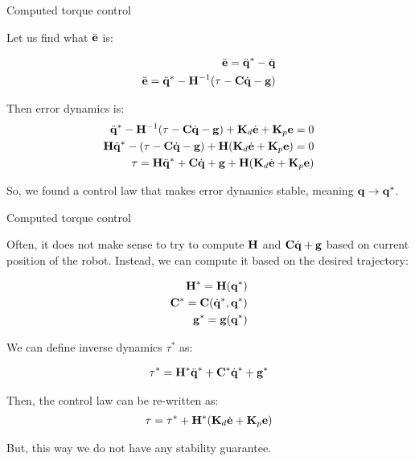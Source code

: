 \documentclass{beamer}
\begin{document}
\begin{frame}{Computed torque control}
	\begin{flushleft}
		
		Let us find what  $\ddot{\mathbf{e}}$ is:
		
		\begin{align}
			\ddot{\mathbf{e}} = \ddot{\mathbf{q}}^* - \ddot{\mathbf{q}} 
			\\
			\ddot{\mathbf{e}} = \ddot{\mathbf{q}}^* -  \mathbf{H}^{-1}(\tau - \mathbf{C} \dot{\mathbf{q}} - \mathbf{g})
		\end{align}
	
		Then error dynamics is:
		\begin{align}
\ddot{\mathbf{q}}^* -  \mathbf{H}^{-1}(\tau - \mathbf{C} \dot{\mathbf{q}} - \mathbf{g})
 + \mathbf{K}_d \dot{\mathbf{e}} + \mathbf{K}_p \mathbf{e} = 0
 \\
\mathbf{H}\ddot{\mathbf{q}}^* - (\tau - \mathbf{C} \dot{\mathbf{q}} - \mathbf{g})
+ \mathbf{H}(\mathbf{K}_d \dot{\mathbf{e}} + \mathbf{K}_p \mathbf{e}) = 0 
\\
\tau = \mathbf{H}\ddot{\mathbf{q}}^* + \mathbf{C} \dot{\mathbf{q}} + \mathbf{g} +
\mathbf{H}(\mathbf{K}_d \dot{\mathbf{e}} + \mathbf{K}_p \mathbf{e})
		\end{align}				
	
	So, we found a control law that makes error dynamics stable, meaning $\mathbf{q} \rightarrow \mathbf{q}^*$.
		
	\end{flushleft}
\end{frame}



\begin{frame}{Computed torque control}
	\begin{flushleft}
		
		Often, it does not make sense to try to compute $\mathbf{H}$ and $\mathbf{C} \dot{\mathbf{q}} + \mathbf{g}$ based on current position of the robot. Instead, we can compute it based on the desired trajectory:
		
		 \begin{align}
		 	\mathbf{H}^* = \mathbf{H}(\mathbf{q}^*) \\
		 	\mathbf{C}^* = \mathbf{C}(\dot{\mathbf{q}}^*, \mathbf{q}^*) \\
		 	\mathbf{g}^* = \mathbf{g}(\mathbf{q}^*) 
		 \end{align}
		
		We can define inverse dynamics $\tau^*$ as:
		
		\begin{align}
			\tau^* = \mathbf{H}^*\ddot{\mathbf{q}}^* + \mathbf{C}^* \dot{\mathbf{q}}^* + \mathbf{g}^*
		\end{align}
		
		Then, the control law can be re-written as:
		\begin{align}
			\tau = \tau^* +
			\mathbf{H}^*(\mathbf{K}_d \dot{\mathbf{e}} + \mathbf{K}_p \mathbf{e})
		\end{align}				
		
		But, this way we do not have any stability guarantee.
		
	\end{flushleft}
\end{frame}
\end{document}
